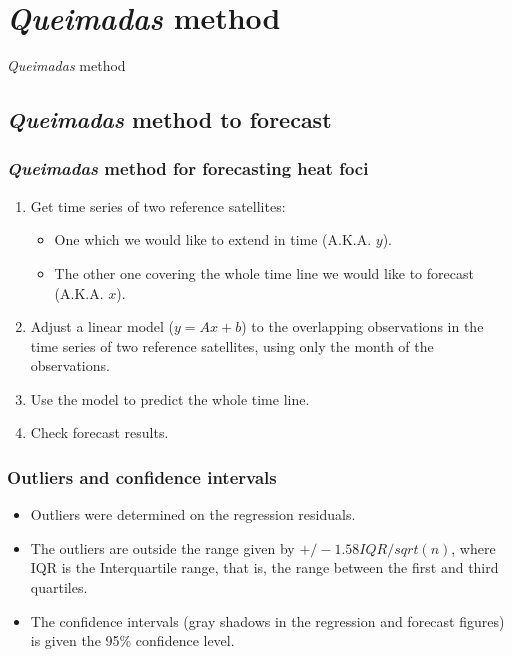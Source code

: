 \section{\textit{Queimadas} method}

\begin{frame}
  \textit{Queimadas} method
\end{frame}






\subsection{\textit{Queimadas} method to forecast}

\begin{frame}
  \frametitle{\textit{Queimadas} method for forecasting heat foci}
  \begin{enumerate}
    \item Get time series of two reference satellites:
    \begin{itemize}
      \item One which we would like to extend in time (A.K.A. $y$).
      \item The other one covering the whole time line we would like to
      forecast (A.K.A. $x$).
    \end{itemize}
    \item Adjust a linear model ($y = Ax + b$) to the overlapping observations
    in the time series of two reference satellites, using only the month of the
    observations.
    \item Use the model to predict the whole time line.
    \item Check forecast results.
  \end{enumerate}
\end{frame}

\begin{frame}
  \frametitle{Outliers and confidence intervals}
  \begin{itemize}
    \item Outliers were determined on the regression residuals.
    \item The outliers are outside the range given by $+/-1.58 IQR/sqrt(n)$,
      where IQR is the Interquartile range, that is, the range between the
      first and third quartiles.
    \item The confidence intervals (gray shadows in the regression and forecast
      figures) is given the 95\% confidence level.
  \end{itemize}
\end{frame}

